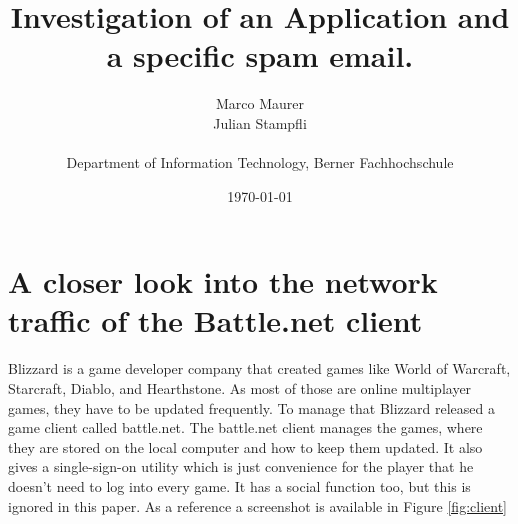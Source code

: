 \documentclass[12pt]{article}
\title{Investigation of an Application and a specific spam email.}
\author
{Marco Maurer \\
Julian Stampfli\\
\\
\normalsize{Department of Information Technology, Berner Fachhochschule}\\
}
\date{\today}
\begin{document}
 


\baselineskip24pt


\maketitle 



\clearpage


\section{A closer look into the network traffic of the Battle.net client}

Blizzard is a game developer company that created games like World of Warcraft, Starcraft, Diablo, and Hearthstone. As most of those are online multiplayer games, they have to be updated frequently. To manage that Blizzard released a game client called battle.net. The battle.net client manages the games, where they are stored on the local computer and how to keep them updated. It also gives a single-sign-on utility which is just convenience for the player that he doesn't need to log into every game. It has a social function too, but this is ignored in this paper. As a reference a screenshot is available in Figure \ref{fig:client}  \cite{battlenet}
\end{document}
